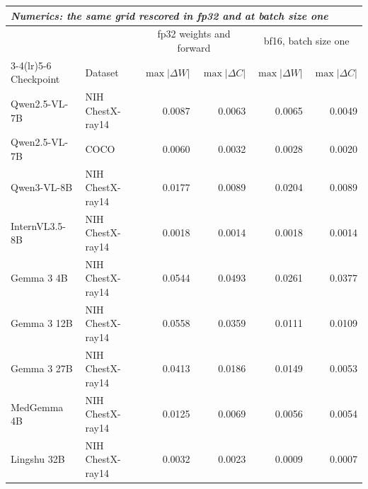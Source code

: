 \begin{table}[h]
\medskip
\setlength{\tabcolsep}{5pt}
\begin{tabular}{llrrrr}
\toprule
\multicolumn{6}{l}{\textit{Numerics: the same grid rescored in fp32 and at batch size one}} \\
\midrule
 & & \multicolumn{2}{c}{fp32 weights and forward} & \multicolumn{2}{c}{bf16, batch size one} \\
\cmidrule(lr){3-4}\cmidrule(lr){5-6}
Checkpoint & Dataset & $\max|\Delta W|$ & $\max|\Delta C|$ & $\max|\Delta W|$ & $\max|\Delta C|$ \\
\midrule
Qwen2.5-VL-7B & NIH ChestX-ray14 & 0.0087 & 0.0063 & 0.0065 & 0.0049 \\
Qwen2.5-VL-7B & COCO & 0.0060 & 0.0032 & 0.0028 & 0.0020 \\
Qwen3-VL-8B & NIH ChestX-ray14 & 0.0177 & 0.0089 & 0.0204 & 0.0089 \\
InternVL3.5-8B & NIH ChestX-ray14 & 0.0018 & 0.0014 & 0.0018 & 0.0014 \\
Gemma 3 4B & NIH ChestX-ray14 & 0.0544 & 0.0493 & 0.0261 & 0.0377 \\
Gemma 3 12B & NIH ChestX-ray14 & 0.0558 & 0.0359 & 0.0111 & 0.0109 \\
Gemma 3 27B & NIH ChestX-ray14 & 0.0413 & 0.0186 & 0.0149 & 0.0053 \\
MedGemma 4B & NIH ChestX-ray14 & 0.0125 & 0.0069 & 0.0056 & 0.0054 \\
Lingshu 32B & NIH ChestX-ray14 & 0.0032 & 0.0023 & 0.0009 & 0.0007 \\
\bottomrule
\end{tabular}
\end{table}
